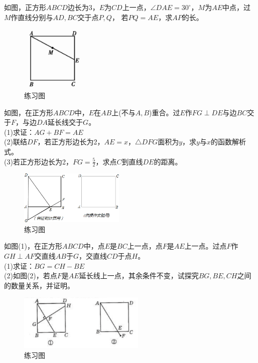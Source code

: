 \documentclass{ecnuthesis}
\begin{document}
\begin{problem}
    如图，正方形$ABCD$边长为3，$E$为$CD$上一点，$\angle DAE=30^\circ$，$M$为$AE$中点，过$M$作直线分别与$AD,BC$交于点$P,Q$，
    若$PQ=AE$，求$AP$的长。
\end{problem}
\begin{figure}[H]
\centering
\includegraphics[width=3cm]{picture/6103.png}
\caption{练习图}
\end{figure}
\begin{problem}
    如图，在正方形$ABCD$中，$E$在$AB$上(不与$A,B$)重合。过$E$作$FG\perp DE$与边$BC$交于$F$，与边$DA$延长线交于$G$。 \\
    (1)求证：$AG+BF=AE$ \\
    (2)联结$DF$，若正方形边长为2，$AE=x$，$\triangle DFG$面积为$y$，求$y$与$x$的函数解析式。\\
    (3)若正方形边长为2，$FG=\frac{5}{2}$，求点$C$到直线$DE$的距离。\\
\end{problem}
\begin{figure}[H]
\centering
\includegraphics[width=5cm]{picture/6_3_1.png}
\caption{练习图}
\end{figure}
\begin{problem}
    如图(1)，在正方形$ABCD$中，点$E$是$BC$上一点，点$F$是$AE$上一点。过点$F$作$GH\perp AF$交直线$AB$于$G$，交直线$CD$于点$H$。 \\
    (1)求证：$BG=CH-BE$ \\
    (2)如图(2)，若点$F$是$AE$延长线上一点，其余条件不变，试探究$BG,BE,CH$之间的数量关系，并证明。\\
\end{problem}
\begin{figure}[H]
\centering
\includegraphics[width=6cm]{picture/648.png}
\caption{练习图}
\end{figure}
\clearpage
\end{document}
